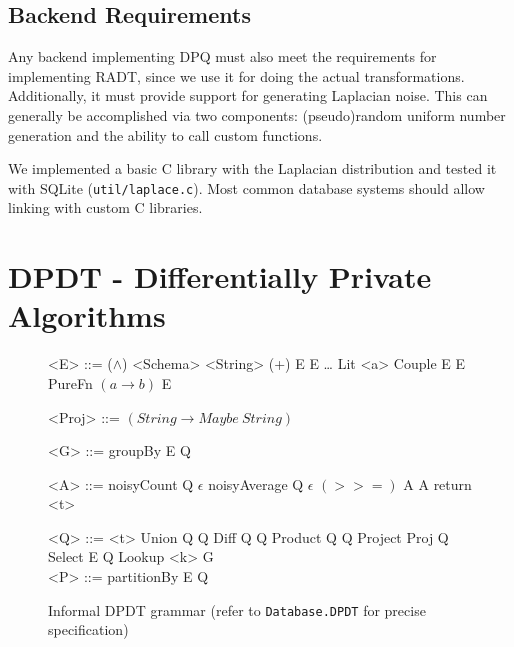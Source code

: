 \documentclass[12pt]{report}
\begin{document}
\section{Backend Requirements}\label{sec:DPQ_requirements}

Any backend implementing DPQ must also meet the requirements for implementing RADT, since we use it for doing the actual transformations.
Additionally, it must provide support for generating Laplacian noise.
This can generally be accomplished via two components: (pseudo)random uniform number generation and the ability to call custom functions.

We implemented a basic C library with the Laplacian distribution and tested it with SQLite (\texttt{util/laplace.c}).
Most common database systems should allow linking with custom C libraries.

\chapter{DPDT - Differentially Private Algorithms}\label{sec:DPDT}

\begin{figure}[H]
\begin{mdframed}
\begin{minipage}[t]{0.5\textwidth}
  \begin{grammar}
    <E> ::= \phantom
    \alt ($\land$) <Schema> <String>
    \alt (+) E E
    \alt \ldots
    \alt Lit <a>
    \alt Couple E E
    \alt PureFn $(a \rightarrow b)$ E

    <Proj> ::= $(String \rightarrow Maybe\ String)$

    <G> ::= \phantom
    \alt groupBy E Q

    <A> ::= \phantom
    \alt noisyCount Q $\epsilon$
    \alt noisyAverage Q $\epsilon$
    \alt $(>>=)$ A A
    \alt return <t>
  \end{grammar}
\end{minipage} %
\begin{minipage}[t]{0.5\textwidth}
  \begin{grammar}
    <Q> ::= \phantom
    \alt <t>
    \alt Union Q Q
    \alt Diff Q Q
    \alt Product Q Q
    \alt Project Proj Q
    \alt Select E Q
    \alt Lookup <k> G
    \\

    <P> ::= \phantom
    \alt partitionBy E Q
  \end{grammar}
\end{minipage}
\end{mdframed}
\caption{Informal DPDT grammar (refer to \texttt{Database.DPDT} for precise specification)}
\label{gram:radt}
\end{figure}
\end{document}
